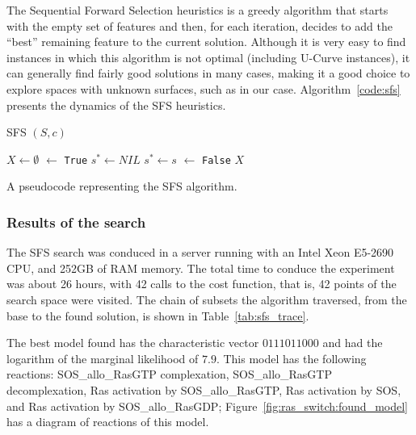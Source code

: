 The Sequential Forward Selection heuristics is a greedy algorithm that
starts with the empty set of features and then, for each iteration,
decides to add the ``best'' remaining feature to the current solution.
Although it is very easy to find instances in which this algorithm is
not optimal (including U-Curve instances), it can generally find fairly
good solutions in many cases, making it a good choice to explore spaces
with unknown surfaces, such as in our case. Algorithm~\ref{code:sfs}
presents the dynamics of the SFS heuristics.

\begin{algorithm}[H]
\textsc{SFS} $(S, c)$
\begin{algorithmic}[1]
    \State $X \gets \emptyset$
     $\gets$ {\tt True}
        \State $s^* \gets NIL$
                \State $s^* \gets s$
            \EndIf
        \EndFor
             $\gets$ {\tt False}
        \EndIf
    \EndWhile
    \Return $X$
\end{algorithmic}
\caption{A pseudocode representing the SFS algorithm.}
\label{code:sfs}
\end{algorithm}


\subsubsection{Results of the search}
The SFS search was conduced in a server running with an Intel 
Xeon E5-2690 CPU, and 252GB of RAM memory. The total time to conduce the
experiment was about 26 hours, with 42 calls to the cost function, that
is, 42 points of the search space were visited. The chain of subsets the
algorithm traversed, from the base to the found solution, is shown in 
Table~\ref{tab:sfs_trace}.

The best model found has the characteristic vector $0111011000$ and had 
the logarithm of the marginal likelihood of $7.9$. This model has the 
following reactions: SOS\_allo\_RasGTP complexation, SOS\_allo\_RasGTP
decomplexation, Ras activation by SOS\_allo\_RasGTP, Ras activation
by SOS, and Ras activation by SOS\_allo\_RasGDP;
Figure~\ref{fig:ras_switch:found_model} has a diagram of reactions of
this model.


